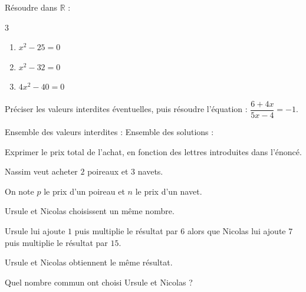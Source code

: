 \documentclass[a4paper,11pt,fleqn]{article}
\begin{document}
\begin{EXO}{}{}
Résoudre dans $\mathbb{R}$ :

\begin{multicols}{3}
\begin{enumerate}[itemsep=1em]
	\item \begin{minipage}[t]{\linewidth} $x^{2}-25=0$ 

 \end{minipage}
	\item \begin{minipage}[t]{\linewidth} $x^{2}-32=0$

 \end{minipage}
	\item \begin{minipage}[t]{\linewidth} $4x^{2}-40=0$

 \end{minipage}
\end{enumerate}
\end{multicols}
\end{EXO}

\begin{EXO}{}{}



 Préciser les valeurs interdites éventuelles, puis résoudre l'équation : $\dfrac{6+4x}{5x-4}=-1$.

Ensemble des valeurs interdites : 
Ensemble des solutions : 
\end{EXO}

\begin{EXO}{}{}
Exprimer le prix total de l'achat, en fonction des lettres introduites dans l'énoncé.


 Nassim veut acheter $2$ poireaux et $3$ navets.

On note $p$ le prix d'un poireau et $n$ le prix d'un navet.
\end{EXO}

\begin{EXO}{}{}



 Ursule et Nicolas choisissent un même nombre.

 Ursule lui ajoute $1$ puis multiplie le résultat par $6$ alors que Nicolas lui ajoute $7$ puis multiplie le résultat par $15$.

Ursule et Nicolas obtiennent le même résultat.

Quel nombre commun ont choisi Ursule et Nicolas ?
\end{EXO}
\end{document}
